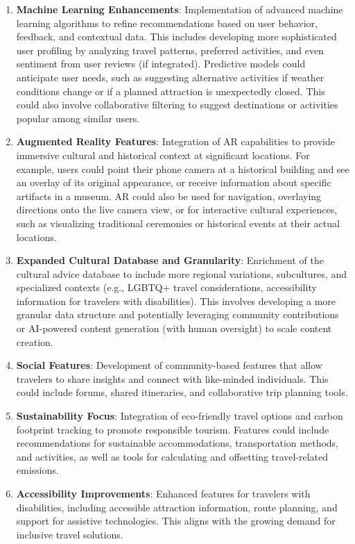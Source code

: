 \documentclass[11pt, a4paper]{article}
\begin{document}
\begin{enumerate}
    \item \textbf{Machine Learning Enhancements}: Implementation of advanced machine learning algorithms to refine recommendations based on user behavior, feedback, and contextual data. This includes developing more sophisticated user profiling by analyzing travel patterns, preferred activities, and even sentiment from user reviews (if integrated). Predictive models could anticipate user needs, such as suggesting alternative activities if weather conditions change or if a planned attraction is unexpectedly closed. This could also involve collaborative filtering to suggest destinations or activities popular among similar users.
    
    \item \textbf{Augmented Reality Features}: Integration of AR capabilities to provide immersive cultural and historical context at significant locations. For example, users could point their phone camera at a historical building and see an overlay of its original appearance, or receive information about specific artifacts in a museum. AR could also be used for navigation, overlaying directions onto the live camera view, or for interactive cultural experiences, such as visualizing traditional ceremonies or historical events at their actual locations.
    
    \item \textbf{Expanded Cultural Database and Granularity}: Enrichment of the cultural advice database to include more regional variations, subcultures, and specialized contexts (e.g., LGBTQ+ travel considerations, accessibility information for travelers with disabilities). This involves developing a more granular data structure and potentially leveraging community contributions or AI-powered content generation (with human oversight) to scale content creation.
    
    \item \textbf{Social Features}: Development of community-based features that allow travelers to share insights and connect with like-minded individuals. This could include forums, shared itineraries, and collaborative trip planning tools.
    
    \item \textbf{Sustainability Focus}: Integration of eco-friendly travel options and carbon footprint tracking to promote responsible tourism. Features could include recommendations for sustainable accommodations, transportation methods, and activities, as well as tools for calculating and offsetting travel-related emissions.
    
    \item \textbf{Accessibility Improvements}: Enhanced features for travelers with disabilities, including accessible attraction information, route planning, and support for assistive technologies. This aligns with the growing demand for inclusive travel solutions.
\end{enumerate}
\end{document}
